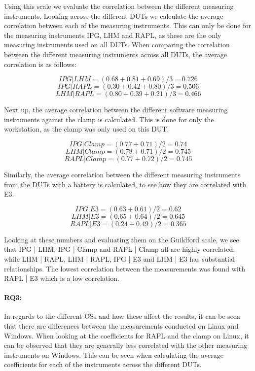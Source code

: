 

Using this scale we evaluate the correlation between the different measuring instruments. Looking across the different DUTs we calculate the average correlation between each of the measuring instruments. This can only be done for the measuring instruments IPG, LHM and RAPL, as these are the only measuring instruments used on all DUTs. When comparing the correlation between the different measuring instruments across all DUTs, the average correlation is as follows:

$$IPG | LHM = (0.68+0.81+0.69)/3 = 0.726$$
$$IPG | RAPL = (0.30+0.42+0.80)/3 = 0.506$$
$$LHM | RAPL = (0.80+0.39+0.21)/3 = 0.466$$

Next up, the average correlation between the different software measuring instruments against the clamp is calculated. This is done for only the workstation, as the clamp was only used on this DUT.

$$IPG | Clamp = (0.77+0.71)/2 = 0.74$$
$$LHM | Clamp = (0.78+0.71)/2 = 0.745$$
$$RAPL | Clamp = (0.77+0.72)/2 = 0.745$$

Similarly, the average correlation between the different measuring instruments from the DUTs with a battery is calculated, to see how they are correlated with E3.

$$IPG | E3 = (0.63+0.61)/2 = 0.62$$
$$LHM | E3 = (0.65+0.64)/2 = 0.645$$
$$RAPL | E3 = (0.24+0.49)/2 = 0.365$$

Looking at these numbers and evaluating them on the Guildford scale, we see that IPG | LHM, IPG | Clamp and RAPL | Clamp all are highly correlated, while LHM | RAPL, LHM | RAPL, IPG | E3 and LHM | E3 has substantial relationships. The lowest correlation between the measurements was found with RAPL | E3 which is a low correlation.

\paragraph{RQ3:} In regards to the different OSs and how these affect the results, it can be seen that there are differences between the measurements conducted on Linux and Windows. When looking at the coefficients for RAPL and the clamp on Linux, it can be observed that they are generally less correlated with the other measuring instruments on Windows. This can be seen when calculating the average coefficients for each of the instruments across the different DUTs.

